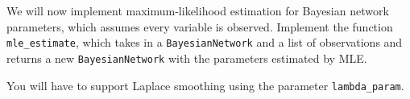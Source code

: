 \item {}

We will now implement maximum-likelihood estimation for Bayesian network parameters, which assumes every variable is observed. Implement the function \texttt{mle\_estimate}, which takes in a \texttt{BayesianNetwork} and a list of observations and returns a new \texttt{BayesianNetwork} with the parameters estimated by MLE.

You will have to support Laplace smoothing using the parameter \texttt{lambda\_param}.

